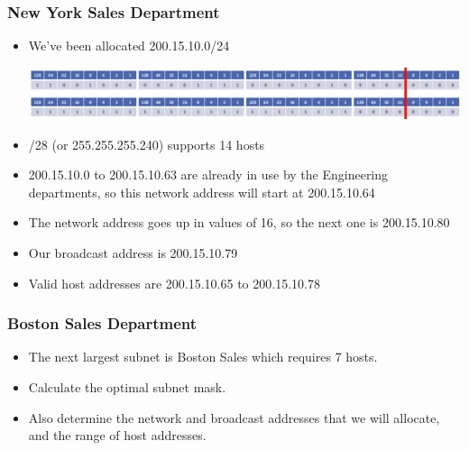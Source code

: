 \documentclass[pdflatex,compress]{beamer}
\begin{document}
\begin{frame}
	\frametitle{New York Sales Department}
	\begin{itemize}
		\item We’ve been allocated 200.15.10.0/24
		\begin{center}
			\includegraphics[width=\linewidth]{img/img11}
		\end{center}
		\item /28 (or 255.255.255.240) supports 14 hosts
		\item 200.15.10.0 to 200.15.10.63 are already in use by the Engineering departments, so this network address will start at 200.15.10.64
		\item The network address goes up in values of 16, so the next one is 200.15.10.80
		\item Our broadcast address is 200.15.10.79
		\item Valid host addresses are 200.15.10.65 to 200.15.10.78
	\end{itemize}
\end{frame}

\begin{frame}
	\frametitle{Boston Sales Department}
	\begin{itemize}
		\item The next largest subnet is Boston Sales which requires 7 hosts.
		\item Calculate the optimal subnet mask.
		\item Also determine the network and broadcast addresses that we will allocate, and the range of host addresses.
	\end{itemize}
\end{frame}
\end{document}
